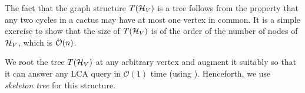 The fact that the graph structure $T({\cal H}_V)$ is a tree follows from the property that any two cycles in a cactus may have at most one vertex in common. It is a simple exercise to show that the size of $T({\cal H}_V)$ is of the order of the number of nodes of ${\cal H}_V$, which is 
${\cal O}(n)$. 

We root the tree $T({\cal H}_V)$ at any arbitrary vertex and augment it suitably so that it can answer any LCA query in $\mathcal O(1)$ time (using \cite{DBLP:journals/jal/BenderFPSS05}). Henceforth, we use \textit{skeleton tree} for this structure.

